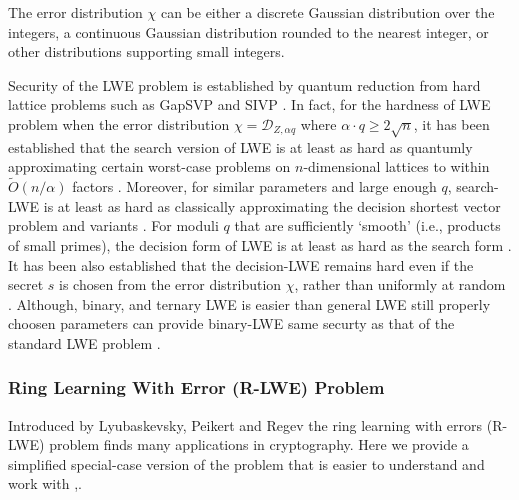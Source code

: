 The error distribution $\chi$ can be either a discrete Gaussian distribution over the integers, a continuous Gaussian distribution rounded to the nearest integer, or other distributions supporting small integers.

Security of the LWE problem is established by quantum reduction from hard lattice problems such as GapSVP and SIVP \cite{regev2009lattices}. %
In fact, for the hardness of LWE problem when the error distribution $\chi = \mathcal{D}_{Z,\alpha q}$ where $\alpha \cdot q \geq 2 \sqrt{n}$, it has been established that the search version of LWE is at least as hard as quantumly approximating certain worst-case problems on $n$-dimensional lattices to within $\tilde{O}(n/\alpha)$ factors \cite{regev2009lattices}. Moreover, for similar parameters and large enough $q$, search-LWE is at least as hard as classically approximating the decision shortest vector problem and variants \cite{peikert2009public}. For moduli $q$ that are sufficiently `smooth' (i.e., products of small primes), the decision form of LWE is at least as hard as the search form \cite{peikert2009public,regev2009lattices}. It has been also established that the decision-LWE remains hard even if the secret $s$ is chosen from the error distribution $\chi$, rather than uniformly at random \cite{micciancio2009lattice,applebaum2009fast}.  Although, binary, and ternary LWE is easier than general LWE still properly choosen parameters can provide binary-LWE same securty as that of the standard LWE problem \cite{chen2020concrete,bai2014lattice}.



\subsubsection{Ring Learning With Error (R-LWE) Problem}

Introduced by Lyubaskevsky, Peikert and Regev \cite{lyubashevsky2013ideal} the ring learning with errors (R-LWE) problem finds many applications in cryptography. Here we provide a simplified special-case version of the problem that is easier to understand and work with \cite{brakerski2011fully},\cite{regev2010learning}.

